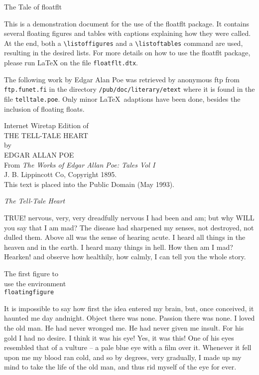 \documentclass[11pt]{article}
\begin{document}
\centerline{\Huge The Tale of
\textsf{floatflt}}\bigskip

\noindent This is a demonstration document for the use
of the \textsf{floatflt} package.  It contains several
floating figures and tables with captions explaining how
they were called.  At the end, both a
\verb+\listoffigures+ and a \verb+\listoftables+ command
are used, resulting in the desired lists.  For more
details on how to use the \textsf{floatflt} package,
please run \LaTeX{} on the file \texttt{floatflt.dtx}.

The following work by Edgar Alan Poe was retrieved by
anonymous ftp from \texttt{ftp.funet.fi} in the
directory \texttt{/pub/doc/literary/etext} where it is
found in the file \texttt{telltale.poe}.  Only minor
\LaTeX\ adaptions have been done, besides the inclusion
of floating floats.

\begin{center}
Internet Wiretap Edition of\\[2mm]
{\large THE TELL-TALE HEART}\\
by\\ {\large EDGAR ALLAN POE}\\[2mm]
From \textit{The Works of Edgar Allan Poe: Tales Vol I}\\
J. B. Lippincott Co, Copyright 1895.\\[2mm]
This text is placed into the Public Domain (May 1993).\\
\end{center}

\noindent\textit{\Large The Tell-Tale Heart}

\noindent TRUE! nervous, very, very dreadfully nervous
I had been and am; but why WILL you say
that I am mad? The disease had sharpened
my senses, not destroyed, not dulled them. Above
all was the sense of hearing acute. I heard all things
in the heaven and in the earth. I heard many things
in hell. How then am I mad? Hearken! and observe how healthily, how
calmly, I can tell you the
whole story.

\begin{floatingfigure}{60mm}
\begin{center}
The first figure to\\ use the environment\\ \texttt{floatingfigure}
\end{center}
\caption{The \texttt{floatingfigure} environment with \texttt{60mm}
for \textit{width} and no \textit{option}.}
\end{floatingfigure}
It is impossible to say how first the idea entered
my brain, but, once conceived, it haunted me day
and\linebreak night. Object there was none. Passion there
was none. I loved the old man. He had never
wronged me. He had never given me insult. For
his gold I had no desire. I think it was his eye!
Yes, it was this! One of his eyes resembled that
of a vulture -- a pale blue eye with a film over it.
Whenever it fell upon me my blood ran cold, and
so by degrees, very gradually, I made up my mind
to take the life of the old man, and thus rid myself
of the eye for ever.
\end{document}
